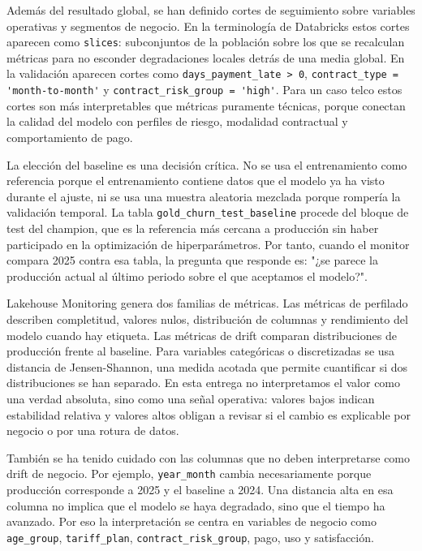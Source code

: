 \documentclass[12pt,a4paper]{article}
\begin{document}
Además del resultado global, se han definido cortes de seguimiento sobre variables operativas y segmentos de negocio. En la terminología de Databricks estos cortes aparecen como \nolinkurl{slices}: subconjuntos de la población sobre los que se recalculan métricas para no esconder degradaciones locales detrás de una media global. En la validación aparecen cortes como \nolinkurl{days_payment_late > 0}, \nolinkurl{contract_type = 'month-to-month'} y \nolinkurl{contract_risk_group = 'high'}. Para un caso telco estos cortes son más interpretables que métricas puramente técnicas, porque conectan la calidad del modelo con perfiles de riesgo, modalidad contractual y comportamiento de pago.\par

La elección del baseline es una decisión crítica. No se usa el entrenamiento como referencia porque el entrenamiento contiene datos que el modelo ya ha visto durante el ajuste, ni se usa una muestra aleatoria mezclada porque rompería la validación temporal. La tabla \nolinkurl{gold_churn_test_baseline} procede del bloque de test del champion, que es la referencia más cercana a producción sin haber participado en la optimización de hiperparámetros. Por tanto, cuando el monitor compara 2025 contra esa tabla, la pregunta que responde es: "¿se parece la producción actual al último periodo sobre el que aceptamos el modelo?".\par

Lakehouse Monitoring genera dos familias de métricas. Las métricas de perfilado describen completitud, valores nulos, distribución de columnas y rendimiento del modelo cuando hay etiqueta. Las métricas de drift comparan distribuciones de producción frente al baseline. Para variables categóricas o discretizadas se usa distancia de Jensen-Shannon, una medida acotada que permite cuantificar si dos distribuciones se han separado. En esta entrega no interpretamos el valor como una verdad absoluta, sino como una señal operativa: valores bajos indican estabilidad relativa y valores altos obligan a revisar si el cambio es explicable por negocio o por una rotura de datos.\par

También se ha tenido cuidado con las columnas que no deben interpretarse como drift de negocio. Por ejemplo, \nolinkurl{year_month} cambia necesariamente porque producción corresponde a 2025 y el baseline a 2024. Una distancia alta en esa columna no implica que el modelo se haya degradado, sino que el tiempo ha avanzado. Por eso la interpretación se centra en variables de negocio como \nolinkurl{age_group}, \nolinkurl{tariff_plan}, \nolinkurl{contract_risk_group}, pago, uso y satisfacción.\par
\end{document}
